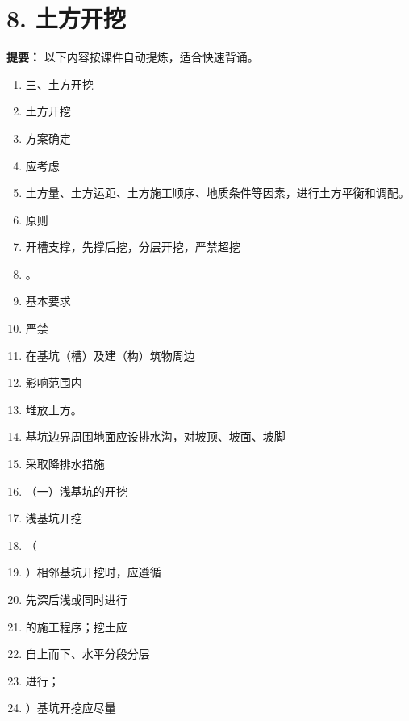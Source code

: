 \documentclass[UTF8,fontset=fandol,11pt]{ctexart}
\begin{document}
\newpage

\section*{8. 土方开挖}


\begin{mainbox}

\textbf{提要：} 以下内容按课件自动提炼，适合快速背诵。

\end{mainbox}

\begin{enumerate}[label=\arabic*.]

\item 三、土方开挖

\item 土方开挖

\item 方案确定

\item 应考虑

\item 土方量、土方运距、土方施工顺序、地质条件等因素，进行土方平衡和调配。

\item 原则

\item 开槽支撑，先撑后挖，分层开挖，严禁超挖

\item 。

\item 基本要求

\item 严禁

\item 在基坑（槽）及建（构）筑物周边

\item 影响范围内

\item 堆放土方。

\item 基坑边界周围地面应设排水沟，对坡顶、坡面、坡脚

\item 采取降排水措施

\item （一）浅基坑的开挖

\item 浅基坑开挖

\item （

\item ）相邻基坑开挖时，应遵循

\item 先深后浅或同时进行

\item 的施工程序；挖土应

\item 自上而下、水平分段分层

\item 进行；

\item ）基坑开挖应尽量

\end{enumerate}
\end{document}
